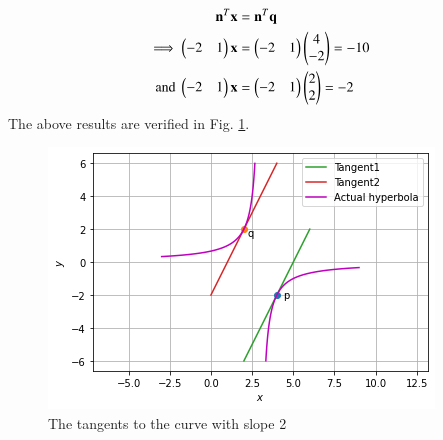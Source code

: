 \begin{align}
    \mathbf{n}^T\mathbf{x}&=\mathbf{n}^T\mathbf{q}\\
    \implies \begin{pmatrix}-2&1\end{pmatrix}\mathbf{x}&=\begin{pmatrix}-2&1\end{pmatrix}\begin{pmatrix}4\\-2\end{pmatrix}=-10\\
    \text{and }\begin{pmatrix}-2&1\end{pmatrix}\mathbf{x}&=\begin{pmatrix}-2&1\end{pmatrix}\begin{pmatrix}2\\2\end{pmatrix}=-2
\end{align}
%
The above results are verified in Fig. \ref{quadform/41/fig:tangents}.	
\begin{figure}[!ht]
\centering
\includegraphics[width=\columnwidth]{solutions/su2021/2/41/figure6_1.png}
\caption{The tangents to the curve with slope 2 }
\label{quadform/41/fig:tangents}	
\end{figure}

